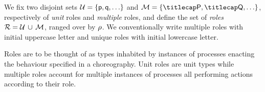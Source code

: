 %

We fix two disjoint sets $\participants = \{\ptp p, \ptp q, \ldots\}$
and $\multiroles = \{\amulti P, \amulti Q, \ldots \}$, respectively of
\emph{unit} roles and \emph{multiple} roles, and define the set of
\emph{roles} $\mathcal{R} = \mathcal{U}\, \cup\, \mathcal{M}$, ranged over by $\rho$. 
%
We conventionally write multiple roles with initial uppercase letter and
unique roles with initial lowercase letter.
%

Roles are to be thought of as types inhabited by instances of
processes enacting the behaviour specified in a choreography.
%
Unit roles are unit types while multiple roles account for multiple
instances of processes all performing actions according to their role.
%

